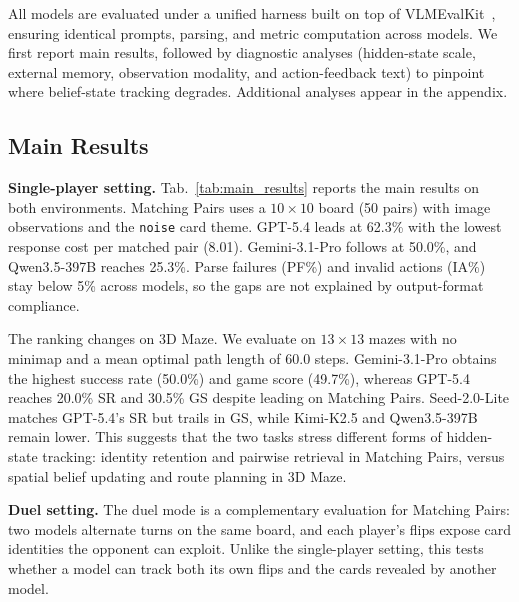 \documentclass{llmxive}
\begin{document}
All models are evaluated under a unified harness built on top of VLMEvalKit~\citep{duan2024vlmevalkit}, ensuring identical prompts, parsing, and metric computation across models. We first report main results, followed by diagnostic analyses (hidden-state scale, external memory, observation modality, and action-feedback text) to pinpoint where belief-state tracking degrades. Additional analyses appear in the appendix.

\subsection{Main Results}
\label{sec:main_results}

\noindent\textbf{Single-player setting.} Tab.~\ref{tab:main_results} reports the main results on both environments. Matching Pairs uses a $10{\times}10$ board (50 pairs) with image observations and the \texttt{noise} card theme. GPT-5.4 leads at 62.3\% with the lowest response cost per matched pair (8.01). Gemini-3.1-Pro follows at 50.0\%, and Qwen3.5-397B reaches 25.3\%. Parse failures (PF\%) and invalid actions (IA\%) stay below 5\% across models, so the gaps are not explained by output-format compliance.

The ranking changes on 3D Maze. We evaluate on $13{\times}13$ mazes with no minimap and a mean optimal path length of 60.0 steps. Gemini-3.1-Pro obtains the highest success rate (50.0\%) and game score (49.7\%), whereas GPT-5.4 reaches 20.0\% SR and 30.5\% GS despite leading on Matching Pairs. Seed-2.0-Lite matches GPT-5.4's SR but trails in GS, while Kimi-K2.5 and Qwen3.5-397B remain lower. This suggests that the two tasks stress different forms of hidden-state tracking: identity retention and pairwise retrieval in Matching Pairs, versus spatial belief updating and route planning in 3D Maze.



\noindent\textbf{Duel setting.} The duel mode is a complementary evaluation for Matching Pairs: two models alternate turns on the same board, and each player's flips expose card identities the opponent can exploit. Unlike the single-player setting, this tests whether a model can track both its own flips and the cards revealed by another model.
\end{document}

